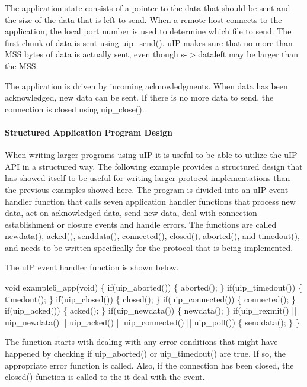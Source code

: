 The application state consists of a pointer to the data that should be sent and the size of the data that is left to send. When a remote host connects to the application, the local port number is used to determine which file to send. The first chunk of data is sent using uip\+\_\+send(). u\+IP makes sure that no more than M\+SS bytes of data is actually sent, even though s-\/$>$dataleft may be larger than the M\+SS.

The application is driven by incoming acknowledgments. When data has been acknowledged, new data can be sent. If there is no more data to send, the connection is closed using uip\+\_\+close().\hypertarget{a00074_example6}{}\paragraph{Structured Application Program Design}\label{a00074_example6}
When writing larger programs using u\+IP it is useful to be able to utilize the u\+IP A\+PI in a structured way. The following example provides a structured design that has showed itself to be useful for writing larger protocol implementations than the previous examples showed here. The program is divided into an u\+IP event handler function that calls seven application handler functions that process new data, act on acknowledged data, send new data, deal with connection establishment or closure events and handle errors. The functions are called newdata(), acked(), senddata(), connected(), closed(), aborted(), and timedout(), and needs to be written specifically for the protocol that is being implemented.

The u\+IP event handler function is shown below.


\begin{DoxyCode}
\textcolor{keywordtype}{void} example6\_app(\textcolor{keywordtype}{void}) \{
  \textcolor{keywordflow}{if}(uip\_aborted()) \{
    aborted();
  \}
  \textcolor{keywordflow}{if}(uip\_timedout()) \{
    timedout();
  \}
  \textcolor{keywordflow}{if}(uip\_closed()) \{
    closed();
  \}
  \textcolor{keywordflow}{if}(uip\_connected()) \{
    connected();
  \}
  \textcolor{keywordflow}{if}(uip\_acked()) \{
    acked();
  \}
  \textcolor{keywordflow}{if}(uip\_newdata()) \{
    newdata();
  \}
  \textcolor{keywordflow}{if}(uip\_rexmit() ||
     uip\_newdata() ||
     uip\_acked() ||
     uip\_connected() ||
     uip\_poll()) \{
    senddata();
  \}
\}
\end{DoxyCode}


The function starts with dealing with any error conditions that might have happened by checking if uip\+\_\+aborted() or uip\+\_\+timedout() are true. If so, the appropriate error function is called. Also, if the connection has been closed, the closed() function is called to the it deal with the event.

